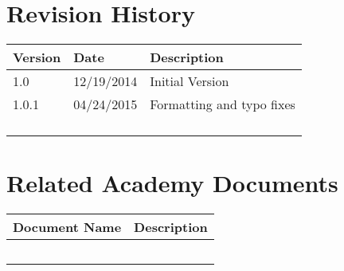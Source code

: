 \prelimsectionformat	%
\chapter{Revision History}

\begin{tabularx}{\linewidth}{|l|l|X|}
    \hline
    Version & Date       & Description \\ \hline
    1.0     & 12/19/2014 & Initial Version
    \\ \hline
    1.0.1   & 04/24/2015 & Formatting and typo fixes \\ \hline
    &   &   \\ \hline
    &   &   \\ \hline
    &   &   \\ \hline
    &   &   \\ \hline
\end{tabularx}

\vspace{0.25in} %
\chapter{Related Academy Documents} %
\begin{tabularx}{\linewidth}{|l|X|}
    \hline
    Document Name & Description \\ \hline
    & \\ \hline
    & \\ \hline
    & \\ \hline
    & \\ \hline
    & \\ \hline
\end{tabularx}